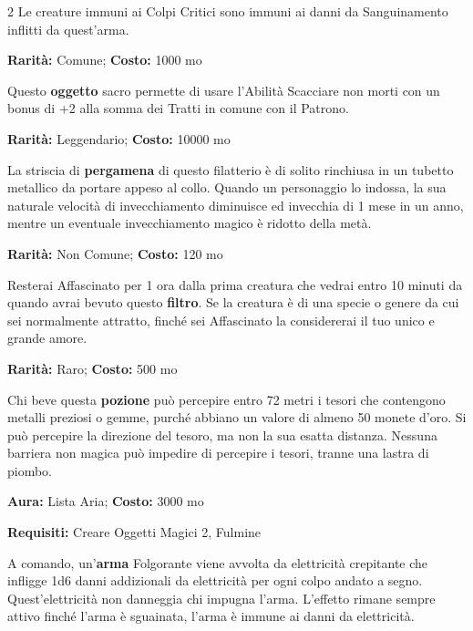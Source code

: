 \begin{multicols}{2}
Le creature immuni ai Colpi Critici sono immuni ai danni da Sanguinamento inflitti da quest'arma.


\textbf{Rarità:} Comune; \textbf{Costo:} 1000 mo

Questo \textbf{oggetto} sacro permette di usare l'Abilità Scacciare non morti con un bonus di +2 alla somma dei Tratti in comune con il Patrono.


\textbf{Rarità:} Leggendario; \textbf{Costo:} 10000 mo

La striscia di \textbf{pergamena} di questo filatterio è di solito rinchiusa in un tubetto metallico da portare appeso al collo. Quando un personaggio lo indossa, la sua naturale velocità di invecchiamento diminuisce ed invecchia di 1 mese in un anno, mentre un eventuale invecchiamento magico è ridotto della metà.


\textbf{Rarità:} Non Comune; \textbf{Costo:} 120 mo

Resterai Affascinato per 1 ora dalla prima creatura che vedrai entro 10 minuti da quando avrai bevuto questo \textbf{filtro}. Se la creatura è di una specie o genere da cui sei normalmente attratto, finché sei Affascinato la considererai il tuo unico e grande amore.


\textbf{Rarità:} Raro; \textbf{Costo:} 500 mo

Chi beve questa \textbf{pozione} può percepire entro 72 metri i tesori che contengono metalli preziosi o gemme, purché abbiano un valore di almeno 50 monete d'oro. Si può percepire la direzione del tesoro, ma non la sua esatta distanza. Nessuna barriera non magica può impedire di percepire i tesori, tranne una lastra di piombo.


\textbf{Aura:} Lista Aria; \textbf{Costo:} 3000 mo

\textbf{Requisiti:} Creare Oggetti Magici 2, Fulmine

A comando, un'\textbf{arma} Folgorante viene avvolta da elettricità crepitante che infligge 1d6 danni addizionali da elettricità per ogni colpo andato a segno. Quest'elettricità non danneggia chi impugna l'arma. L'effetto rimane sempre attivo finché l'arma è sguainata, l'arma è immune ai danni da elettricità.


\end{multicols}
